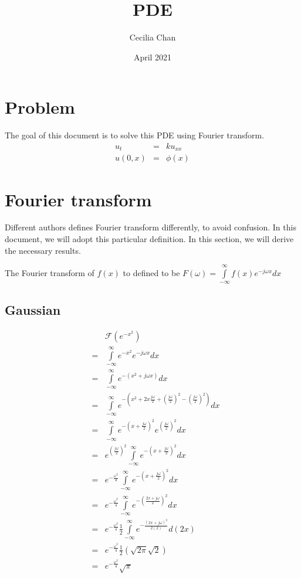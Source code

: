 \documentclass{article}
\title{PDE}
\author{Cecilia Chan}
\date{April 2021}
\begin{document}
\maketitle

\section*{Problem}
The goal of this document is to solve this PDE using Fourier transform.
\begin{eqnarray*}
      u_t &=& ku_{xx} \\
  u(0, x) &=& \phi(x)
\end{eqnarray*}

\section*{Fourier transform}
Different authors defines Fourier transform differently, to avoid confusion. In this document, we will adopt this particular definition. In this section, we will derive the necessary results.

The Fourier transform of $ f(x) $ to defined to be $ F(\omega) = \int\limits_{-\infty}^{\infty}f(x)e^{-j\omega x}dx $

\subsection*{Gaussian}

\begin{eqnarray*}
  & & \mathcal{F}(e^{-x^2}) \\
  &=& \int\limits_{-\infty}^{\infty}e^{-x^2}e^{-j\omega x}dx \\
  &=& \int\limits_{-\infty}^{\infty}e^{-(x^2+j\omega x)}dx \\
  &=& \int\limits_{-\infty}^{\infty}e^{-\left(x^2+2x\frac{j\omega }{2}+\left(\frac{j\omega}{2}\right)^2-\left(\frac{j\omega}{2}\right)^2\right)}dx \\
  &=& \int\limits_{-\infty}^{\infty}e^{-\left(x + \frac{j\omega}{2}\right)^2}e^{\left(\frac{j\omega}{2}\right)^2}dx \\  
  &=& e^{\left(\frac{j\omega}{2}\right)^2}\int\limits_{-\infty}^{\infty}e^{-\left(x + \frac{j\omega}{2}\right)^2}dx \\
  &=& e^{-\frac{\omega^2}{4}}\int\limits_{-\infty}^{\infty}e^{-\left(x + \frac{j\omega}{2}\right)^2}dx \\  
  &=& e^{-\frac{\omega^2}{4}}\int\limits_{-\infty}^{\infty}e^{-\left( \frac{2x + j\omega}{2}\right)^2}dx \\ 
  &=& e^{-\frac{\omega^2}{4}}\frac{1}{2}\int\limits_{-\infty}^{\infty}e^{-\frac{(2x + j\omega)^2}{2(2)}}d(2x) \\
  &=& e^{-\frac{\omega^2}{4}}\frac{1}{2}(\sqrt{2\pi}\sqrt{2}) \\
  &=& e^{-\frac{\omega^2}{4}}\sqrt{\pi}
\end{eqnarray*}
\end{document}
